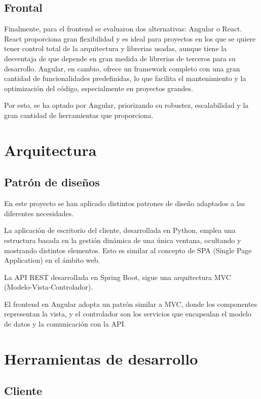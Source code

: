 \subsection{Frontal}\label{subsec:frontal}

Finalmente, para el frontend se evaluaron dos alternativas: Angular o React.
React proporciona gran flexibilidad y es ideal para proyectos en los que se quiere tener control total de la arquitectura
y librerias usadas, aunque tiene la desventaja de que depende en gran medida de librerias de terceros para su desarrollo.
Angular, en cambio, ofrece un framework completo con una gran cantidad de funcionalidades predefinidas, lo que facilita
el mantenimiento y la optimización del código, especialmente en proyectos grandes.

Por esto, se ha optado por Angular\cite{angular:docs}, priorizando su robustez, escalabilidad y la gran cantidad de herramientas que proporciona.

\section{Arquitectura}\label{sec:arquitectura}

\subsection{Patrón de diseños}\label{subsec:patron}

En este proyecto se han aplicado distintos patrones de diseño adaptados a las diferentes necesidades.

La aplicación de escritorio del cliente, desarrollada en Python, emplea una estructura basada en la gestión dinámica
de una única ventana, ocultando y mostrando distintos elementos.
Esto es similar al concepto de SPA (Single Page Application) en el ámbito web.

La API REST desarrollada en Spring Boot, sigue una arquitectura MVC (Modelo-Vista-Controlador)\cite{wikipedia:mvc}.

El frontend en Angular adopta un patrón similar a MVC, donde los componentes representan la vista, y el controlador
son los servicios que encapsulan el modelo de datos y la comunicación con la API.

\section{Herramientas de desarrollo}\label{sec:desarrollo}

\subsection{Cliente}\label{subsec:desarrollo_cliente}

